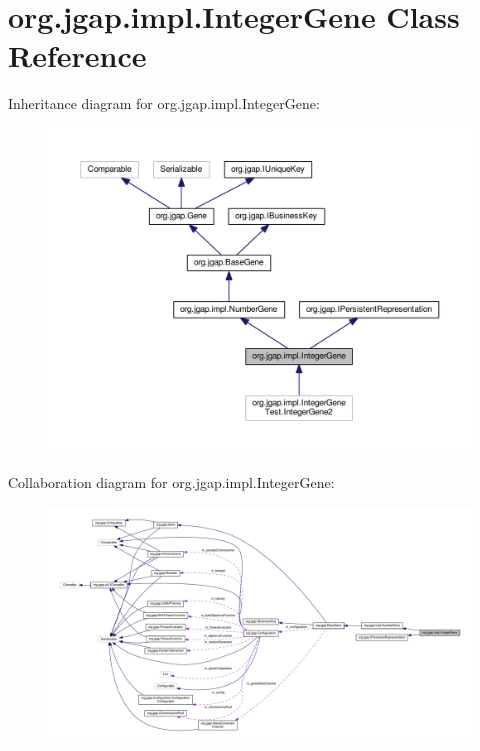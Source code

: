 \hypertarget{classorg_1_1jgap_1_1impl_1_1_integer_gene}{\section{org.\-jgap.\-impl.\-Integer\-Gene Class Reference}
\label{classorg_1_1jgap_1_1impl_1_1_integer_gene}
}


Inheritance diagram for org.\-jgap.\-impl.\-Integer\-Gene\-:
\nopagebreak
\begin{figure}[H]
\begin{center}
\leavevmode
\includegraphics[width=350pt]{classorg_1_1jgap_1_1impl_1_1_integer_gene__inherit__graph}
\end{center}
\end{figure}


Collaboration diagram for org.\-jgap.\-impl.\-Integer\-Gene\-:
\nopagebreak
\begin{figure}[H]
\begin{center}
\leavevmode
\includegraphics[width=350pt]{classorg_1_1jgap_1_1impl_1_1_integer_gene__coll__graph}
\end{center}
\end{figure}
